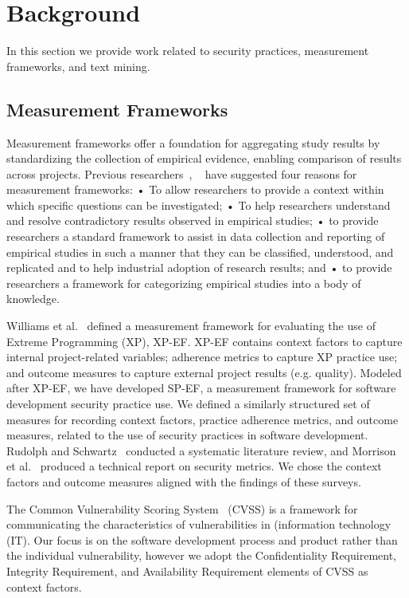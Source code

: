 \section{Background}
\label{sec:background}
In this section we provide work related to security practices, measurement frameworks, and text mining.

\subsection{Measurement Frameworks}
Measurement frameworks offer a foundation for aggregating study results by standardizing the collection of empirical evidence, enabling comparison of results across projects. Previous researchers~\cite{kitchenham1999towards}, ~\cite{williams2004toward} have suggested four reasons for measurement frameworks: 
• To allow researchers to provide a context within which specific questions can be investigated;
• To help researchers understand and resolve contradictory results observed in empirical studies;
• to provide researchers a standard framework to assist in data collection and reporting of empirical studies in such a manner that they can be classified, understood, and replicated and to help industrial adoption of research results; and
• to provide researchers a framework for categorizing empirical studies into a body of knowledge.

Williams et al.~\cite{williams2004toward} defined a measurement framework for evaluating the use of Extreme Programming (XP), XP-EF. XP-EF contains context factors to capture internal project-related variables; adherence metrics to capture XP practice use; and outcome measures to capture external project results (e.g. quality). Modeled after XP-EF, we have developed SP-EF, a measurement framework for software development security practice use. We defined a similarly structured set of measures for recording context factors, practice adherence metrics, and outcome measures, related to the use of security practices in software development.
Rudolph and Schwartz~\cite{rudolph2012critical} conducted a systematic literature review, and Morrison et al.~\cite{morrison2014mapping} produced a technical report on security metrics. We chose the context factors and outcome measures aligned with the findings of these surveys.

The Common Vulnerability Scoring System~\cite{mell2006common} (CVSS) is a framework for communicating the characteristics of vulnerabilities in  (information technology (IT). Our focus is on the software development process and product rather than the individual vulnerability, however we adopt the Confidentiality Requirement, Integrity Requirement, and Availability Requirement elements of CVSS as context factors.

